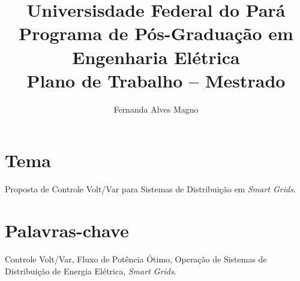 \documentclass[]{IEEEphot}
\title{Universisdade Federal do Pará\\Programa de Pós-Graduação em Engenharia Elétrica\\Plano de Trabalho – Mestrado}
\begin{document}
\author{Fernanda Alves Magno}


\maketitle




	\section{Tema}
Proposta de Controle Volt/Var para Sistemas de Distribuição em \textit{Smart Grids}.

\section{Palavras-chave}
Controle Volt/Var, Fluxo de Potência Ótimo, Operação de Sistemas de Distribuição de Energia Elétrica, \textit{Smart Grids}.
\end{document}
